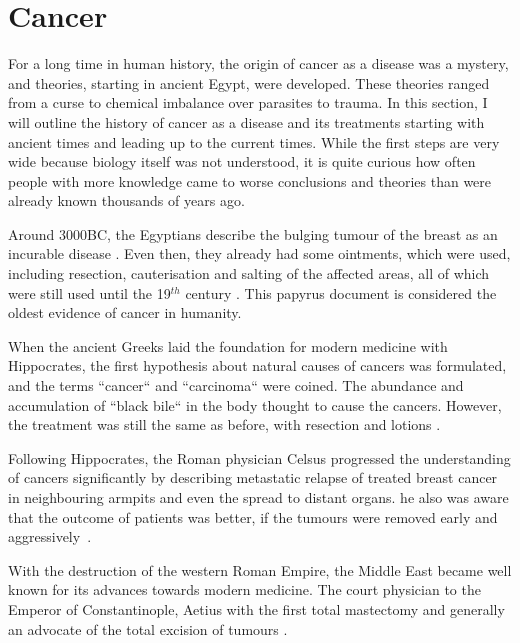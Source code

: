 \section{Cancer}
\label{intro-sec:cancer}

For a long time in human history, the origin of cancer as a disease was a mystery, and  theories, starting in ancient Egypt, were developed. These theories ranged from a curse to chemical imbalance over parasites to trauma. In this section, I will outline the history of cancer as a disease and its treatments starting with ancient times and leading up to the current times. While the first steps are very wide because biology itself was not understood, it is quite curious how often people with more knowledge came to worse conclusions and theories than were already known thousands of years ago.

Around 3000BC, the Egyptians describe the bulging tumour of the breast as an incurable disease \cite{Breasted1930}. Even then, they already had some ointments, which were used, including resection, cauterisation and salting of the affected areas, all of which were still used until the 19$^{th}$ century \cite{Hajdu2004}. This papyrus document is considered the oldest evidence of cancer in humanity.

When the ancient Greeks laid the foundation for modern medicine with Hippocrates, the first hypothesis about natural causes of cancers was formulated, and the terms ``cancer`` and ``carcinoma`` were coined. The abundance and accumulation of ``black bile`` in the body  thought to cause the cancers. However, the treatment was still the same as before, with resection and lotions \cite{Chadwick1950}.

Following Hippocrates, the Roman physician Celsus progressed the understanding of cancers significantly by describing metastatic relapse of treated breast cancer in neighbouring armpits and even the spread to distant organs.  he also was aware that the outcome of patients was better, if the tumours were removed early and aggressively~\cite{Celsus1939}.

With the destruction of the western Roman Empire, the Middle East became well known for its  advances towards modern medicine. The court physician to the Emperor of Constantinople, Aetius  with the first total mastectomy and  generally an advocate of the total excision of tumours \cite{Browne2012}. 


